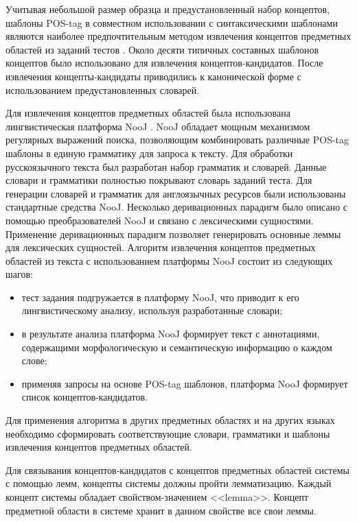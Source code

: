 Учитывая небольшой размер образца и предустановленный набор концептов, шаблоны POS-tag в совместном использовании с синтаксическими шаблонами являются наиболее предпочтительным методом извлечения концептов предметных областей из заданий тестов \cite{hulth2003improved} \cite{khokhlova2012lexico} \cite{bolsh2007lexico}. Около десяти типичных составных шаблонов концептов было использовано для извлечения концептов-кандидатов.  После извлечения концепты-кандидаты приводились к канонической форме с использованием предустановленных словарей.

Для извлечения концептов предметных областей была использована лингвистическая платформа NooJ \cite{silberztein2002nooj}. NooJ обладает мощным механизмом регулярных выражений поиска, позволяющим комбинировать различные POS-tag шаблоны в единую грамматику для запроса к тексту. Для обработки русскоязычного текста был разработан набор грамматик и словарей. Данные словари и грамматики полностью покрывают словарь заданий теста. Для генерации словарей и грамматик для англоязычных ресурсов были использованы стандартные средства NooJ. Несколько деривационных парадигм было описано с помощью преобразователей NooJ и связано с лексическими сущностями. Применение деривационных парадигм позволяет генерировать основные леммы для лексических сущностей. Алгоритм извлечения концептов предметных областей из текста с использованием платформы NooJ состоит из следующих шагов:

\begin{itemize}
\item тест задания подгружается в платформу NooJ, что приводит к его лингвистическому анализу, используя разработанные словари;
\item в результате анализа платформа NooJ формирует текст с аннотациями, содержащими морфологическую и семантическую информацию о каждом слове;
\item применяя запросы на основе POS-tag шаблонов, платформа NooJ формирует список концептов-кандидатов.
\end{itemize}

Для применения алгоритма в других предметных областях и на других языках необходимо сформировать соответствующие словари, грамматики и шаблоны извлечения концептов предметных областей.

Для связывания концептов-кандидатов с концептов предметных областей системы с помощью лемм, концепты системы должны пройти лемматизацию. Каждый концепт системы обладает свойством-значением <<lemma>>. Концепт предметной области в  системе хранит в данном свойстве все свои леммы.

